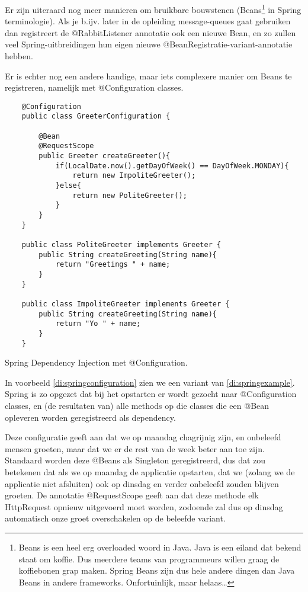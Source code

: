Er zijn uiteraard nog meer manieren om bruikbare bouwstenen (Beans\footnote{
Beans is een heel erg overloaded woord in Java. Java is een eiland dat bekend staat om koffie. Dus
meerdere teams van programmeurs willen graag de koffiebonen grap maken. Spring Beans zijn dus hele 
andere dingen dan Java Beans in andere frameworks. Onfortuinlijk, maar helaas\ldots
} in Spring terminologie). Als je b.ijv. later in de opleiding message-queues gaat gebruiken dan 
registreert de @RabbitListener annotatie ook een nieuwe Bean, en zo zullen veel Spring-uitbreidingen
hun eigen nieuwe @BeanRegistratie-variant-annotatie hebben.

Er is echter nog een andere handige, maar iets complexere manier om Beans te registreren, namelijk met
@Configuration classes. 

\begin{listing}[H]
    \begin{verbatim}
    @Configuration
    public class GreeterConfiguration {

        @Bean
        @RequestScope
        public Greeter createGreeter(){
            if(LocalDate.now().getDayOfWeek() == DayOfWeek.MONDAY){
                return new ImpoliteGreeter();
            }else{
                return new PoliteGreeter();
            }
        }
    }

    public class PoliteGreeter implements Greeter {
        public String createGreeting(String name){
            return "Greetings " + name;
        } 
    }

    public class ImpoliteGreeter implements Greeter {
        public String createGreeting(String name){
            return "Yo " + name;
        } 
    }
    \end{verbatim}
    \caption{Spring Dependency Injection met @Configuration.}
    \label{di:springconfiguration}
\end{listing}

In voorbeeld \ref{di:springconfiguration} zien we een variant van \ref{di:springexample}. 
Spring is zo opgezet dat bij het opstarten er wordt gezocht naar @Configuration classes, en (de 
resultaten van) alle methods op die classes die een @Bean opleveren worden geregistreerd 
als dependency.

Deze configuratie geeft aan dat we op maandag chagrijnig zijn, en onbeleefd mensen groeten, maar
dat we er de rest van de week beter aan toe zijn. Standaard worden deze @Beans als Singleton 
geregistreerd, dus dat zou betekenen dat als we op maandag de applicatie opstarten, dat we 
(zolang we de applicatie niet afsluiten) ook op dinsdag en verder onbeleefd zouden blijven groeten.
De annotatie @RequestScope geeft aan dat deze methode elk HttpRequest opnieuw uitgevoerd moet worden,
zodoende zal dus op dinsdag automatisch onze groet overschakelen op de beleefde variant.

